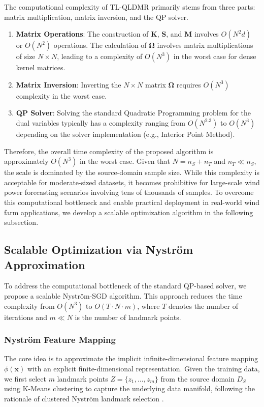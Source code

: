 \documentclass[a4paper]{cas-sc}
\begin{document}
The computational complexity of TL-QLDMR primarily stems from three parts: matrix multiplication, matrix inversion, and the QP solver.
\begin{enumerate}
    \item \textbf{Matrix Operations}: The construction of $\boldsymbol{K}$, $\mathbf{S}$, and $\mathbf{M}$ involves $O(N^2 d)$ or $O(N^2)$ operations. The calculation of $\boldsymbol{\Omega}$ involves matrix multiplications of size $N \times N$, leading to a complexity of $O(N^3)$ in the worst case for dense kernel matrices.
    \item \textbf{Matrix Inversion}: Inverting the $N \times N$ matrix $\boldsymbol{\Omega}$ requires $O(N^3)$ complexity in the worst case.
    \item \textbf{QP Solver}: Solving the standard Quadratic Programming problem for the dual variables typically has a complexity ranging from $O(N^{2.3})$ to $O(N^3)$ depending on the solver implementation (e.g., Interior Point Method).
\end{enumerate}
Therefore, the overall time complexity of the proposed algorithm is approximately $O(N^3)$ in the worst case. Given that $N = n_S + n_T$ and $n_T \ll n_S$, the scale is dominated by the source-domain sample size. While this complexity is acceptable for moderate-sized datasets, it becomes prohibitive for large-scale wind power forecasting scenarios involving tens of thousands of samples. To overcome this computational bottleneck and enable practical deployment in real-world wind farm applications, we develop a scalable optimization algorithm in the following subsection.

\subsection{Scalable Optimization via Nystr\"{o}m Approximation}\label{fast_alg}
To address the computational bottleneck of the standard QP-based solver, we propose a scalable Nystr\"{o}m-SGD algorithm. This approach reduces the time complexity from $O(N^3)$ to $O(T \cdot N \cdot m)$, where $T$ denotes the number of iterations and $m \ll N$ is the number of landmark points.

\subsubsection{Nystr\"{o}m Feature Mapping}
The core idea is to approximate the implicit infinite-dimensional feature mapping $\phi(\boldsymbol{x})$ with an explicit finite-dimensional representation. Given the training data, we first select $m$ landmark points $Z = \{z_1, \ldots, z_m\}$ from the source domain $D_S$ using K-Means clustering to capture the underlying data manifold, following the rationale of clustered Nystr\"{o}m landmark selection \citep{zhang2010clustered}.
\end{document}

